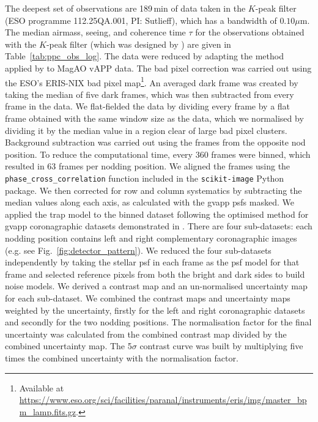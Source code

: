 \documentclass{aa}
\begin{document}
The deepest set of observations are 189\,min of data taken in the $K$-peak filter (ESO programme 112.25QA.001, PI: Sutlieff), which has a bandwidth of $0.10 \mu$m.
%
The median airmass, seeing, and coherence time $\tau$ for the observations obtained with the $K$-peak filter (which was designed by \citealt{2022MNRAS.515.5629D}) are given in Table~\ref{tab:ppc_obs_log}.
%
The data were reduced by adapting the method applied by \citet{2021MNRAS.506.3224S} to MagAO vAPP data.
%
The bad pixel correction was carried out using the ESO's ERIS-NIX bad pixel map\footnote{Available at \url{https://www.eso.org/sci/facilities/paranal/instruments/eris/img/master_bpm_lamp.fits.gz}.}.
%
An averaged dark frame was created by taking the median of five dark frames, which was then subtracted from every frame in the data.
%
We flat-fielded the data by dividing every frame by a flat frame obtained with the same window size as the data, which we normalised by dividing it by the median value in a region clear of large bad pixel clusters.
%
Background subtraction was carried out using the frames from the opposite nod position.
%
To reduce the computational time, every 360 frames were binned, which resulted in 63 frames per nodding position.
%
We aligned the frames using the {\tt phase\_cross\_correlation} function included in the {\tt scikit-image} \citep{scikit-image} Python package.
%
We then corrected for row and column systematics by subtracting the median values along each axis, as calculated with the \ac{gvapp} \acp{psf} masked.
%
We applied the \acl{trap} \citep[\acs{trap};][]{Samland2021TRAP:Separations} model to the binned dataset following the optimised method for \ac{gvapp} coronagraphic datasets demonstrated in \cite{LiuP2023}.
%
There are four sub-datasets: each nodding position contains left and right complementary coronagraphic images (e.g. see Fig.~\ref{fig:detector_pattern}).
%
We reduced the four sub-datasets independently by taking the stellar \ac{psf} in each frame as the \ac{psf} model for that frame and selected reference pixels from both the bright and dark sides to build noise models.
%
We derived a contrast map and an un-normalised uncertainty map for each sub-dataset.
%
We combined the contrast maps and uncertainty maps weighted by the uncertainty, firstly for the left and right coronagraphic datasets and secondly for the two nodding positions. 
%
The normalisation factor for the final uncertainty was calculated from the combined contrast map divided by the combined uncertainty map. 
%
The 5$\sigma$ contrast curve was built by multiplying five times the combined uncertainty with the normalisation factor.
\end{document}
